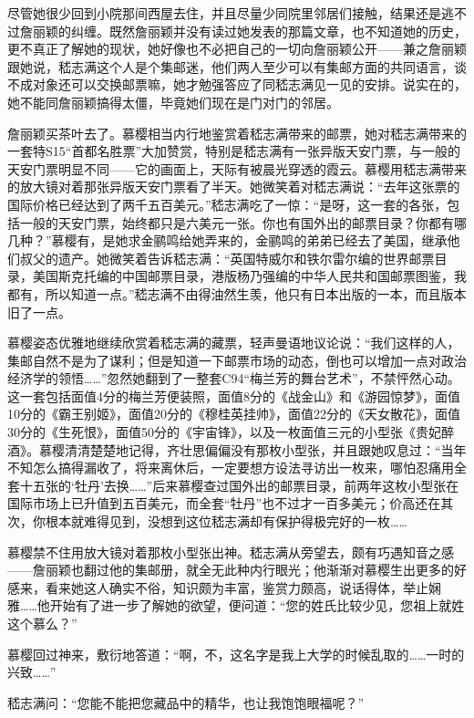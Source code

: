 \par 尽管她很少回到小院那间西屋去住，并且尽量少同院里邻居们接触，结果还是逃不过詹丽颖的纠缠。既然詹丽颖并没有读过她发表的那篇文章，也不知道她的历史，更不真正了解她的现状，她好像也不必把自己的一切向詹丽颖公开——兼之詹丽颖跟她说，嵇志满这个人是个集邮迷，他们两人至少可以有集邮方面的共同语言，谈不成对象还可以交换邮票嘛，她才勉强答应了同嵇志满见一见的安排。说实在的，她不能同詹丽颖搞得太僵，毕竟她们现在是门对门的邻居。
\par 詹丽颖买茶叶去了。慕樱相当内行地鉴赏着嵇志满带来的邮票，她对嵇志满带来的一套特S15“首都名胜票”大加赞赏，特别是嵇志满有一张异版天安门票，与一般的天安门票明显不同——它的画面上，天际有被晨光穿透的霞云。慕樱用嵇志满带来的放大镜对着那张异版天安门票看了半天。她微笑着对嵇志满说：“去年这张票的国际价格已经达到了两千五百美元。”嵇志满吃了一惊：“是呀，这一套的各张，包括一般的天安门票，始终都只是六美元一张。你也有国外出的邮票目录？你都有哪几种？”慕樱有，是她求金鹂鸣给她弄来的，金鹂鸣的弟弟已经去了美国，继承他们叔父的遗产。她微笑着告诉嵇志满：“英国特威尔和铁尔雷尔编的世界邮票目录，美国斯克托编的中国邮票目录，港版杨乃强编的中华人民共和国邮票图鉴，我都有，所以知道一点。”嵇志满不由得油然生羡，他只有日本出版的一本，而且版本旧了一点。
\par 慕樱姿态优雅地继续欣赏着嵇志满的藏票，轻声曼语地议论说：“我们这样的人，集邮自然不是为了谋利；但是知道一下邮票市场的动态，倒也可以增加一点对政治经济学的领悟……”忽然她翻到了一整套C94“梅兰芳的舞台艺术”，不禁怦然心动。这一套包括面值4分的梅兰芳便装照，面值8分的《战金山》和《游园惊梦》，面值10分的《霸王别姬》，面值20分的《穆桂英挂帅》，面值22分的《天女散花》，面值30分的《生死恨》，面值50分的《宇宙锋》，以及一枚面值三元的小型张《贵妃醉酒》。慕樱清清楚楚地记得，齐壮思偏偏没有那枚小型张，并且跟她叹息过：“当年不知怎么搞得漏收了，将来离休后，一定要想方设法寻访出一枚来，哪怕忍痛用全套十五张的‘牡丹’去换……”后来慕樱查过国外出的邮票目录，前两年这枚小型张在国际市场上已升值到五百美元，而全套“牡丹”也不过才一百多美元；价高还在其次，你根本就难得见到，没想到这位嵇志满却有保护得极完好的一枚……
\par 慕樱禁不住用放大镜对着那枚小型张出神。嵇志满从旁望去，颇有巧遇知音之感——詹丽颖也翻过他的集邮册，就全无此种内行眼光；他渐渐对慕樱生出更多的好感来，看来她这人确实不俗，知识颇为丰富，鉴赏力颇高，说话得体，举止娴雅……他开始有了进一步了解她的欲望，便问道：“您的姓氏比较少见，您祖上就姓这个慕么？”
\par 慕樱回过神来，敷衍地答道：“啊，不，这名字是我上大学的时候乱取的……一时的兴致……”
\par 嵇志满问：“您能不能把您藏品中的精华，也让我饱饱眼福呢？”

